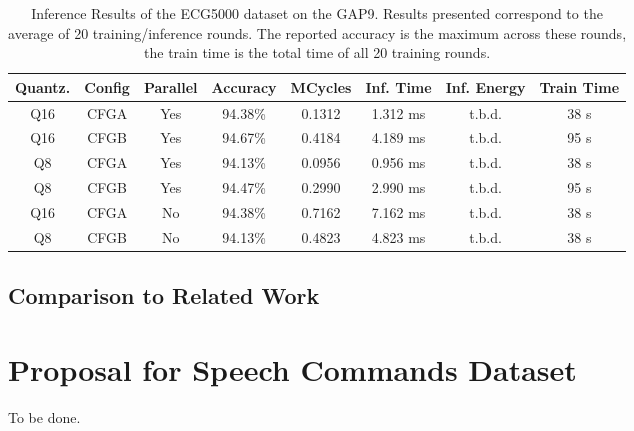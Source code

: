 \begin{table}[h!]
    \centerfloat
    \begin{tabular}{ c c c c c c c c}
    \toprule
    \textbf{Quantz.} & \textbf{Config} & \textbf{Parallel} & \textbf{Accuracy} & \textbf{MCycles} & \textbf{Inf. Time} & \textbf{Inf. Energy} & \textbf{Train Time} \\
    \midrule
    Q16 & CFGA & Yes & 94.38\% & 0.1312 & 1.312 ms & t.b.d. & 38 s\\
    Q16 & CFGB & Yes & 94.67\% & 0.4184 & 4.189 ms & t.b.d. & 95 s\\
    Q8  & CFGA & Yes & 94.13\% & 0.0956 & 0.956 ms & t.b.d. & 38 s\\
    Q8  & CFGB & Yes & 94.47\% & 0.2990 & 2.990 ms & t.b.d. & 95 s\\
    Q16 & CFGA & No  & 94.38\% & 0.7162 & 7.162 ms & t.b.d. & 38 s\\
    Q8  & CFGB & No  & 94.13\% & 0.4823 & 4.823 ms & t.b.d. & 38 s\\
    \bottomrule
    \end{tabular}
    \caption{Inference Results of the ECG5000 dataset on the GAP9. Results presented correspond to the average of 20 training/inference rounds. The reported accuracy is the maximum across these rounds, the train time is the total time of all 20 training rounds.}%
    \label{tbl:gap9_inf_results}
\end{table}

\newpage
\subsection{Comparison to Related Work}

\section{Proposal for Speech Commands Dataset}\label{sec:rs_speechcomms}
To be done.

